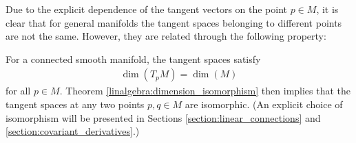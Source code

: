     Due to the explicit dependence of the tangent vectors on the point $p\in M$, it is clear that for general manifolds the tangent spaces belonging to different points are not the same. However, they are related through the following property:
    \begin{property}
        For a connected smooth manifold, the tangent spaces satisfy
        \begin{gather}
            \dim(T_pM)=\dim(M)
        \end{gather}
        for all $p\in M$. Theorem \ref{linalgebra:dimension_isomorphism} then implies that the tangent spaces at any two points $p,q\in M$ are isomorphic. (An explicit choice of isomorphism will be presented in Sections \ref{section:linear_connections} and \ref{section:covariant_derivatives}.)
    \end{property}

